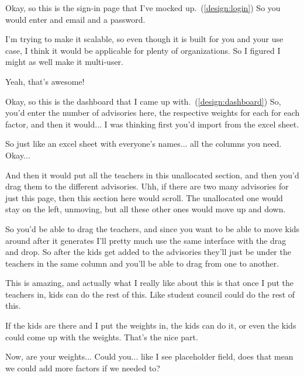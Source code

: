 \documentclass[appendix.tex]{subfiles}
\begin{document}
\begin{interviewer}
Okay, so this is the sign-in page that I've mocked up.~(\cref{design:login})
So you would enter and email and a password.

I'm trying to make it scalable, so even though it is built for you and your use case, I think it would be applicable for plenty of organizations.
So I figured I might as well make it multi-user.
\end{interviewer}

\begin{client}
Yeah, that's awesome!
\end{client}

\begin{interviewer}
Okay, so this is the dashboard that I came up with.~(\cref{design:dashboard})
So, you'd enter the number of advisories here, the respective weights for each for each factor, and then it would...
I was thinking first you'd import from the excel sheet.
\end{interviewer}

\begin{client}
So just like an excel sheet with everyone's names... all the columns you need.
Okay...
\end{client}

\begin{interviewer}
And then it would put all the teachers in this unallocated section, and then you'd drag them to the different advisories.
Uhh, if there are two many advisories for just this page, then this section here would scroll.
The unallocated one would stay on the left, unmoving, but all these other ones would move up and down.

So you'd be able to drag the teachers, and since you want to be able to move kids around after it generates I'll pretty much use the same interface with the drag and drop.
So after the kids get added to the advisories they'll just be under the teachers in the same column and you'll be able to drag from one to another.
\end{interviewer}

\begin{client}
This is amazing, and actually what I really like about this is that once I put the teachers in, kids can do the rest of this.
Like student council could do the rest of this.

If the kids are there and I put the weights in, the kids can do it, or even the kids could come up with the weights.
That's the nice part.

Now, are your weights...
Could you... like I see placeholder field, does that mean we could add more factors if we needed to?
\end{client}
\end{document}
